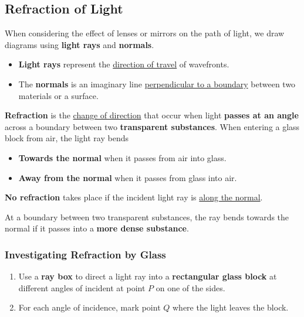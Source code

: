 \subsection{Refraction of Light}

When considering the effect of lenses or mirrors on the path of light, we draw diagrams using \textbf{light rays} and \textbf{normals}.
\begin{itemize}
    \item \textbf{Light rays} represent the \underline{direction of travel} of wavefronts.
    \item The \textbf{normals} is an imaginary line \underline{perpendicular to a boundary} between two materials or a surface.
\end{itemize}

\textbf{Refraction} is the \underline{change of direction} that occur when light \textbf{passes at an angle} across a boundary between two \textbf{transparent substances}. When entering a glass block from air, the light ray bends
\begin{itemize}
    \item \textbf{Towards the normal} when it passes from air into glass.
    \item \textbf{Away from the normal} when it passes from glass into air.
\end{itemize}
\textbf{No refraction} takes place if the incident light ray is \underline{along the normal}.

At a boundary between two transparent substances, the ray bends towards the normal if it passes into a \textbf{more dense substance}.

\subsubsection*{Investigating Refraction by Glass}
\begin{enumerate}
    \item Use a \textbf{ray box} to direct a light ray into a \textbf{rectangular glass block} at different angles of incident at point $P$ on one of the sides.
    \item For each angle of incidence, mark point $Q$ where the light leaves the block.
\end{enumerate}

